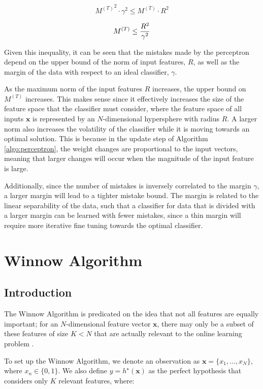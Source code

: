 \documentclass[11pt]{article}
\begin{document}
$${M^{(T)}}^2 \cdot \gamma^2
\leq
M^{(T)} \cdot R^2
$$

\begin{equation}
 \centering
{M^{(T)}} 
\leq
\frac{ R^2} {\gamma^2}
\label{eq:performance-bound}
\end{equation}

Given this inequality, it can be seen that the mistakes made by the perceptron depend on the upper bound of the norm of input features, $R$, as well as the margin of the data with respect to an ideal classifier, $\gamma$. 

As the maximum norm of the input features $R$ increases, the upper bound on $M^{(T)}$ increases. This makes sense since it effectively increases the size of the feature space that the classifier must consider, where the feature space of all inputs $\boldsymbol{x}$ is represented by an $N$-dimensional hypersphere with radius $R$. A larger norm also increases the volatility of the classifier while it is moving towards an optimal solution. This is because in the update step of Algorithm \ref{algo:perceptron}, the weight changes are proportional to the input vectors, meaning that larger changes will occur when the magnitude of the input feature is large.

Additionally, since the number of mistakes is inversely correlated to the margin $\gamma$, a larger margin will lead to a tighter mistake bound. The margin is related to the linear separability of the data, such that a classifier for data that is divided with a larger margin can be learned with fewer mistakes, since a thin margin will require more iterative fine tuning towards the optimal classifier.


\section{Winnow Algorithm}\label{section:winnow}

\subsection{Introduction}

The Winnow Algorithm is predicated on the idea that not all features are equally important; for an $N$-dimensional feature vector $\boldsymbol{x}$, there may only be a subset of these features of size $K < N$ that are actually relevant to the online learning problem \cite{hoi2018online}.

To set up the Winnow Algorithm, we denote an observation as $\boldsymbol{x} = \{x_1,\dots,x_N\}$, where $x_n\in\{0,1\}$. We also define $y=h^\star(\boldsymbol{x})$ as the perfect hypothesis that considers only $K$ relevant features, where:
\end{document}
